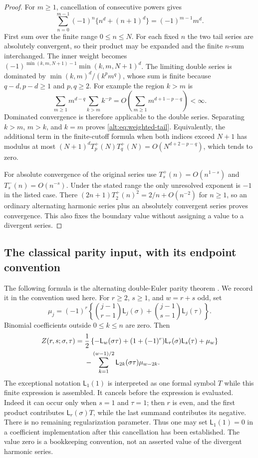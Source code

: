 \begin{proof}
For $m\ge1$, cancellation of consecutive powers gives
\[
 \sum_{n=0}^{m-1}(-1)^n\{n^d+(n+1)^d\}
       =(-1)^{m-1}m^d.
\]
First sum over the finite range $0\le n\le N$. For each fixed $n$
the two tail series are absolutely convergent, so their product may
be expanded and the finite $n$-sum interchanged. The inner weight
becomes $(-1)^{\min(k,m,N+1)-1}\min(k,m,N+1)^d$.
The limiting double series is dominated by
$\min(k,m)^d/(k^p m^q)$, whose sum is finite because $q-d,p-d\ge1$
and $p,q\ge2$. For example the region $k>m$ is
\[
 \sum_{m\ge1}m^{d-q}\sum_{k>m}k^{-p}
       =O\left(\sum_{m\ge1}m^{d+1-p-q}\right)<\infty.
\]
Dominated convergence is therefore applicable to the double series.
Separating $k>m$, $m>k$, and $k=m$ proves
\eqref{alt:eq:weighted-tail}. Equivalently, the additional term in the
finite-cutoff formula when both indices exceed $N+1$ has modulus at
most $(N+1)^d T_p^+(N)T_q^+(N)=O(N^{d+2-p-q})$, which tends to zero.

For absolute convergence of the original series use
$T_s^+(n)=O(n^{1-s})$ and $T_s^-(n)=O(n^{-s})$.
Under the stated range the only unresolved exponent is $-1$ in the
listed case. There
$(2n+1)T_2^+(n)^2=2/n+O(n^{-2})$ for $n\ge1$, so an ordinary
alternating harmonic series plus an absolutely convergent series
proves convergence. This also fixes the boundary value without
assigning a value to a divergent series.
\end{proof}

\subsection{The classical parity input, with its endpoint convention}

The following formula is the alternating double-Euler parity theorem
\cite{Teo,XuWang}. We record it in the convention used here.
For $r\ge2$, $s\ge1$, and $w=r+s$ odd, set
\[
 \mu_j=(-1)^r\left\{
 \binom{j-1}{r-1}\mathsf L_j(\sigma)
 +\binom{j-1}{s-1}\mathsf L_j(\tau)\right\}.
\]
Binomial coefficients outside $0\le k\le n$ are zero. Then
\begin{align}
 Z(r,s;\sigma,\tau)
 ={}&\frac12\left\{-\mathsf L_w(\sigma\tau)
 +(1+(-1)^r)\mathsf L_r(\sigma)\mathsf L_s(\tau)+\mu_w\right\}
 \notag\\
 &-\sum_{k=1}^{(w-1)/2}\mathsf L_{2k}(\sigma\tau)\mu_{w-2k}.
 \label{alt:eq:parity}
\end{align}
The exceptional notation $\mathsf L_1(1)$ is interpreted as one formal
symbol $T$ while this finite expression is assembled. It cancels before
the expression is evaluated. Indeed it can occur only when $s=1$ and
$\tau=1$; then $r$ is even, and the first product contributes
$\mathsf L_r(\sigma)T$, while the last summand contributes its negative.
There is no remaining regularization parameter. Thus one may set
$\mathsf L_1(1)=0$ in a coefficient implementation after this cancellation
has been established. The value zero is a bookkeeping convention, not
an asserted value of the divergent harmonic series.

